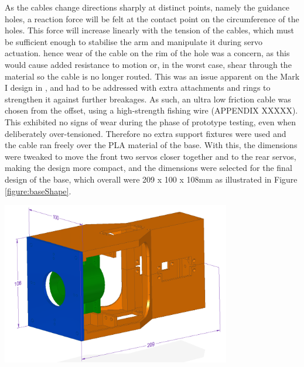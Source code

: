 \documentclass[11pt]{article}
\begin{document}
As the cables change directions sharply at distinct points, namely the guidance holes, a reaction force will be felt at the contact point on the circumference of the holes. This force will increase linearly with the tension of the cables, which must be sufficient enough to stabilise the arm and manipulate it during servo actuation. hence wear of the cable on the rim of the hole was a concern, as this would cause added resistance to motion or, in the worst case, shear through the material so the cable is no longer routed. This was an issue apparent on the Mark I design in \cite{GreggSmithDesign}, and had to be addressed with extra attachments and rings to strengthen it against further breakages. As such, an ultra low friction cable was chosen from the offset, using a high-strength fishing wire (APPENDIX XXXXX). This exhibited no signs of wear during the phase of prototype testing, even when deliberately over-tensioned. Therefore no extra support fixtures were used and the cable ran freely over the PLA material of the base. With this, the dimensions were tweaked to move the front two servos closer together and to the rear servos, making the design more compact, and the dimensions were selected for the final design of the base, which overall were 209 x 100 x 108mm as illustrated in Figure \ref{figure:baseShape}.


\begin{center}
\includegraphics[width=0.75\textwidth]{images/baseShape.png}
\label{figure:baseShape}
\end{center}
\end{document}
